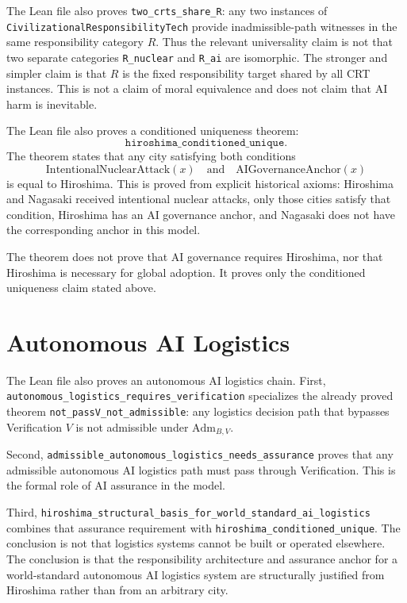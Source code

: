 \documentclass[11pt]{article}
\begin{document}
The Lean file also proves \texttt{two\_crts\_share\_R}: any two instances of
\texttt{CivilizationalResponsibilityTech} provide inadmissible-path witnesses
in the same responsibility category $R$.  Thus the relevant universality claim
is not that two separate categories \texttt{R\_nuclear} and \texttt{R\_ai} are
isomorphic.  The stronger and simpler claim is that $R$ is the fixed
responsibility target shared by all CRT instances.  This is not a claim of
moral equivalence and does not claim that AI harm is inevitable.

The Lean file also proves a conditioned uniqueness theorem:
\[
\texttt{hiroshima\_conditioned\_unique}.
\]
The theorem states that any city satisfying both conditions
\[
\text{IntentionalNuclearAttack}(x)
\quad\text{and}\quad
\text{AIGovernanceAnchor}(x)
\]
is equal to Hiroshima.  This is proved from explicit historical axioms:
Hiroshima and Nagasaki received intentional nuclear attacks, only those cities
satisfy that condition, Hiroshima has an AI governance anchor, and Nagasaki
does not have the corresponding anchor in this model.

The theorem does not prove that AI governance requires Hiroshima, nor that
Hiroshima is necessary for global adoption.  It proves only the conditioned
uniqueness claim stated above.

\section*{Autonomous AI Logistics}

The Lean file also proves an autonomous AI logistics chain.  First,
\texttt{autonomous\_logistics\_requires\_verification} specializes the already
proved theorem \texttt{not\_passV\_not\_admissible}: any logistics decision path
that bypasses Verification $V$ is not admissible under $\mathrm{Adm}_{B,V}$.

Second, \texttt{admissible\_autonomous\_logistics\_needs\_assurance} proves that
any admissible autonomous AI logistics path must pass through Verification.
This is the formal role of AI assurance in the model.

Third,
\texttt{hiroshima\_structural\_basis\_for\_world\_standard\_ai\_logistics}
combines that assurance requirement with
\texttt{hiroshima\_conditioned\_unique}.  The conclusion is not that logistics
systems cannot be built or operated elsewhere.  The conclusion is that the
responsibility architecture and assurance anchor for a world-standard
autonomous AI logistics system are structurally justified from Hiroshima rather
than from an arbitrary city.
\end{document}
